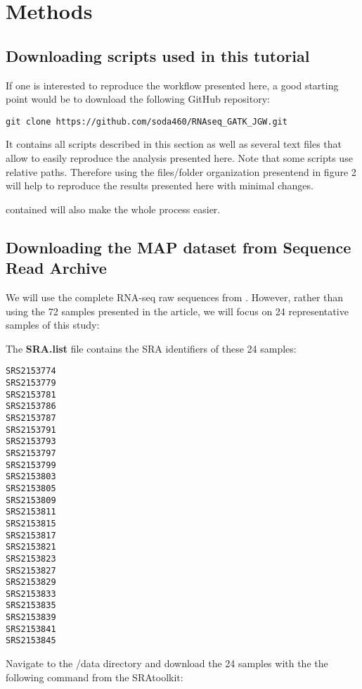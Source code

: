 

\section{Methods}

\subsection{Downloading scripts used in this tutorial}

If one is interested to reproduce the workflow presented here, a good starting point would be to download the following GitHub repository:

\begin{verbatim}
git clone https://github.com/soda460/RNAseq_GATK_JGW.git
\end{verbatim}

It contains all scripts described in this section as well as several text files that allow to easily reproduce the analysis presented here. Note that some scripts use relative paths. Therefore using the files/folder organization presentend in figure 2 will help to reproduce the results presented here with minimal changes.



contained will also make the whole process easier.









\subsection{Downloading the MAP dataset from Sequence Read Archive}

We will use the complete RNA-seq raw sequences from \citep{Ariel2021}. However, rather than using the 72 samples presented in the article, we will focus on 24 representative samples of this study:

The \textbf{SRA.list} file contains the SRA identifiers of these 24 samples:
\begin{verbatim}
SRS2153774
SRS2153779
SRS2153781
SRS2153786
SRS2153787
SRS2153791
SRS2153793
SRS2153797
SRS2153799
SRS2153803
SRS2153805
SRS2153809
SRS2153811
SRS2153815
SRS2153817
SRS2153821
SRS2153823
SRS2153827
SRS2153829
SRS2153833
SRS2153835
SRS2153839
SRS2153841
SRS2153845
\end{verbatim}



Navigate to the /data directory and download the 24 samples with the the following command from the SRAtoolkit:


